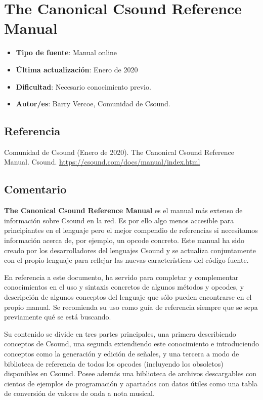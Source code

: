 \section{The Canonical Csound Reference Manual}

 \begin{itemize}
 \item \textbf{Tipo de fuente}: Manual online
 
 \item \textbf{Última actualización}: Enero de 2020
 
 \item \textbf{Dificultad}: Necesario conocimiento previo.
 
 \item \textbf{Autor/es}: Barry Vercoe, Comunidad de Csound.
 \end{itemize}

\subsection{Referencia}

Comunidad de Csound (Enero de 2020). The Canonical Csound Reference Manual. Csound. \url{https://csound.com/docs/manual/index.html}

\subsection{Comentario}

\textbf{The Canonical Csound Reference Manual} es el manual más extenso de información sobre Csound en la red. Es por ello algo menos accesible para principiantes en el lenguaje pero el mejor compendio de referencias si necesitamos información acerca de, por ejemplo, un opcode concreto. Este manual ha sido creado por los desarrolladores del lenguajes Csound y se actualiza conjuntamente con el propio lenguaje para reflejar las nuevas características del código fuente.

En referencia a este documento, ha servido para completar y complementar conocimientos en el uso y sintaxis concretos de algunos métodos y opcodes, y descripción de algunos conceptos del lenguaje que sólo pueden encontrarse en el propio manual.
Se recomienda su uso como guía de referencia siempre que se sepa previamente qué se está buscando.

Su contenido se divide en tres partes principales, una primera describiendo conceptos de Csound, una segunda extendiendo este conocimiento e introduciendo conceptos como la generación y edición de señales, y una tercera a modo de biblioteca de referencia de todos los opcodes (incluyendo los obsoletos) disponibles en Csound. Posee además una biblioteca de archivos descargables con cientos de ejemplos de programación y apartados con datos útiles como una tabla de conversión de valores de onda a nota musical.

